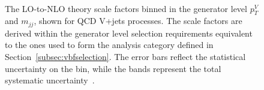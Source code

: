 \begin{figure}[htbp]
    \begin{center}
         \\
        \caption{
            The LO-to-NLO theory scale factors binned in the generator level $p_T^V$ and $m_{jj}$, shown for QCD V+jets processes.
            The scale factors are derived within the generator level selection requirements equivalent to the ones used to form the analysis category defined in Section~\ref{subsec:vbfselection}. The error bars reflect the statistical uncertainty on the bin, while the bands represent the total systematic uncertainty~\cite{note:AN_19_257}.}
      \label{fig:theory_sf_qcd_nlo_2d}
    \end{center}
  \end{figure}
  
